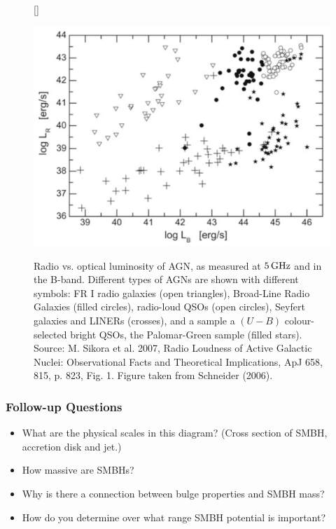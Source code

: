 \documentclass[a4paper,11pt]{article}
\begin{document}
\begin{figure}[h]
    [\FBwidth]
    {\caption{\footnotesize{Radio vs. optical luminosity of AGN, as measured at $5\,{\rm GHz}$ and in the B-band. Different types of AGNs are shown with different symbols: FR I radio galaxies (open triangles), Broad-Line Radio Galaxies (filled circles), radio-loud QSOs (open circles), Seyfert galaxies and LINERs (crosses), and a sample a $(U-B)$ colour-selected bright QSOs, the Palomar-Green sample (filled stars). Source: M. Sikora et al. 2007, Radio Loudness of Active Galactic Nuclei: Observational Facts and Theoretical Implications, ApJ 658, 815, p. 823, Fig. 1. Figure taken from Schneider (2006).}}
    \label{fig:qsoradiovsoptical}}
    {\includegraphics[width=12cm]{figures/QSO_radiovsoptical.png}}
\end{figure}

\subsubsection{Follow-up Questions}

\begin{itemize}
    \item What are the physical scales in this diagram? (Cross section of SMBH, accretion disk and jet.)
    \item How massive are SMBHs?
    \item Why is there a connection between bulge properties and SMBH mass?
    \item How do you determine over what range SMBH potential is important?
\end{itemize}
\end{document}
